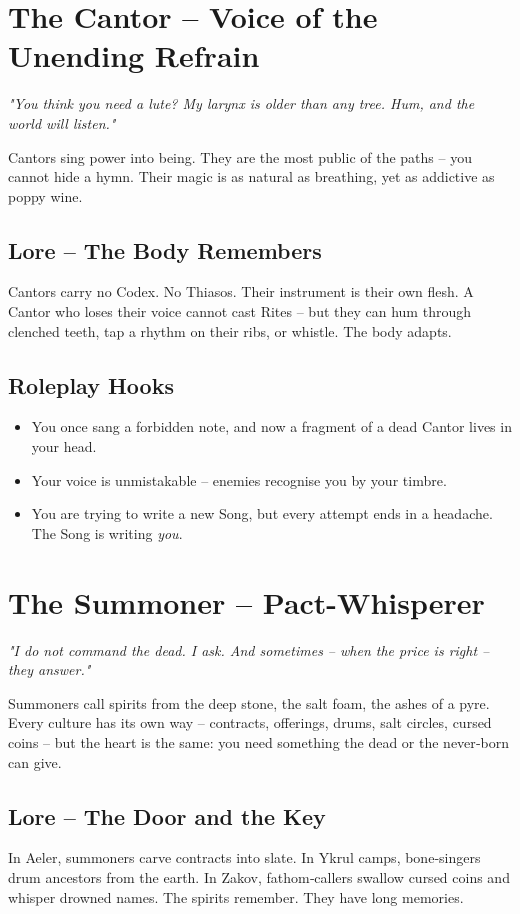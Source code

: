 \documentclass[10pt,a5paper]{book}
\begin{document}
\section{The Cantor -- Voice of the Unending Refrain}
\textit{"You think you need a lute? My larynx is older than any tree. Hum, and the world will listen."}

Cantors sing power into being. They are the most public of the paths -- you cannot hide a hymn. Their magic is as natural as breathing, yet as addictive as poppy wine.

\subsection{Lore -- The Body Remembers}
Cantors carry no Codex. No Thiasos. Their instrument is their own flesh. A Cantor who loses their voice cannot cast Rites -- but they can hum through clenched teeth, tap a rhythm on their ribs, or whistle. The body adapts.

\subsection{Roleplay Hooks}
\begin{itemize}
    \item You once sang a forbidden note, and now a fragment of a dead Cantor lives in your head.
    \item Your voice is unmistakable -- enemies recognise you by your timbre.
    \item You are trying to write a new Song, but every attempt ends in a headache. The Song is writing \textit{you}.
\end{itemize}

\section{The Summoner -- Pact-Whisperer}
\textit{"I do not command the dead. I ask. And sometimes -- when the price is right -- they answer."}

Summoners call spirits from the deep stone, the salt foam, the ashes of a pyre. Every culture has its own way -- contracts, offerings, drums, salt circles, cursed coins -- but the heart is the same: you need something the dead or the never‑born can give.

\subsection{Lore -- The Door and the Key}
In Aeler, summoners carve contracts into slate. In Ykrul camps, bone‑singers drum ancestors from the earth. In Zakov, fathom‑callers swallow cursed coins and whisper drowned names. The spirits remember. They have long memories.
\end{document}
